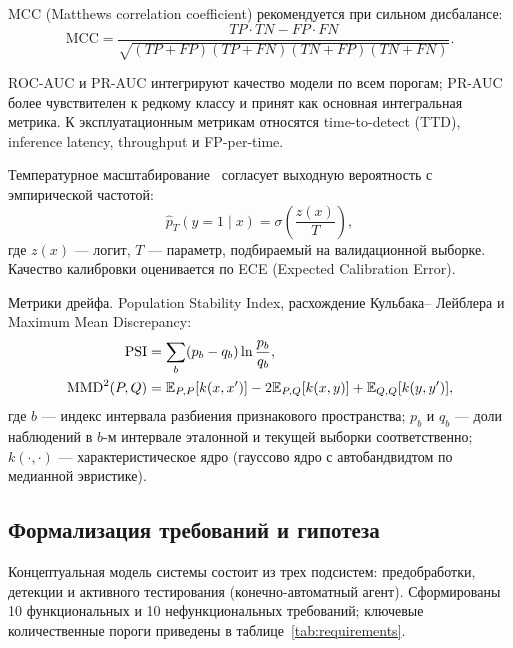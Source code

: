 MCC (Matthews correlation coefficient) рекомендуется при сильном
дисбалансе:
\begin{equation}
\text{MCC} =
\frac{TP \cdot TN - FP \cdot FN}
{\sqrt{(TP+FP)(TP+FN)(TN+FP)(TN+FN)}}.
\label{eq:mcc}
\end{equation}

ROC-AUC и PR-AUC интегрируют качество модели по всем порогам;
PR-AUC более чувствителен к редкому классу и принят как основная
интегральная метрика. К эксплуатационным метрикам относятся
time-to-detect (TTD), inference latency, throughput и FP-per-time.

Температурное масштабирование~\cite{guo2017calibration} согласует
выходную вероятность с эмпирической частотой:
\begin{equation}
\hat{p}_{T}(y=1\mid x) = \sigma\!\left(\frac{z(x)}{T}\right),
\label{eq:temp-scaling}
\end{equation}
где \(z(x)\) --- логит, \(T\) --- параметр, подбираемый на
валидационной выборке. Качество калибровки оценивается по ECE
(Expected Calibration Error).

Метрики дрейфа. Population Stability Index, расхождение Кульбака--
Лейблера и Maximum Mean Discrepancy:
\begin{align}
\operatorname{PSI} &= \sum_{b}(p_b - q_b)\ln\frac{p_b}{q_b},
\label{eq:psi}\\
\operatorname{MMD}^{2}(P, Q) &= \mathbb{E}_{P,P}[k(x,x')] - 2\mathbb{E}_{P,Q}[k(x,y)]
                + \mathbb{E}_{Q,Q}[k(y,y')],\label{eq:mmd}
\end{align}
где \(b\) --- индекс интервала разбиения признакового пространства;
\(p_b\) и \(q_b\) --- доли наблюдений в \(b\)-м интервале
эталонной и текущей выборки соответственно;
\(k(\cdot,\cdot)\) --- характеристическое ядро (гауссово ядро с
автобандвидтом по медианной эвристике).

\subsection{Формализация требований и гипотеза}

Концептуальная модель системы состоит из трех подсистем:
предобработки, детекции и активного тестирования
(конечно-автоматный агент). Сформированы 10 функциональных и
10 нефункциональных требований; ключевые количественные пороги
приведены в таблице~\ref{tab:requirements}.

